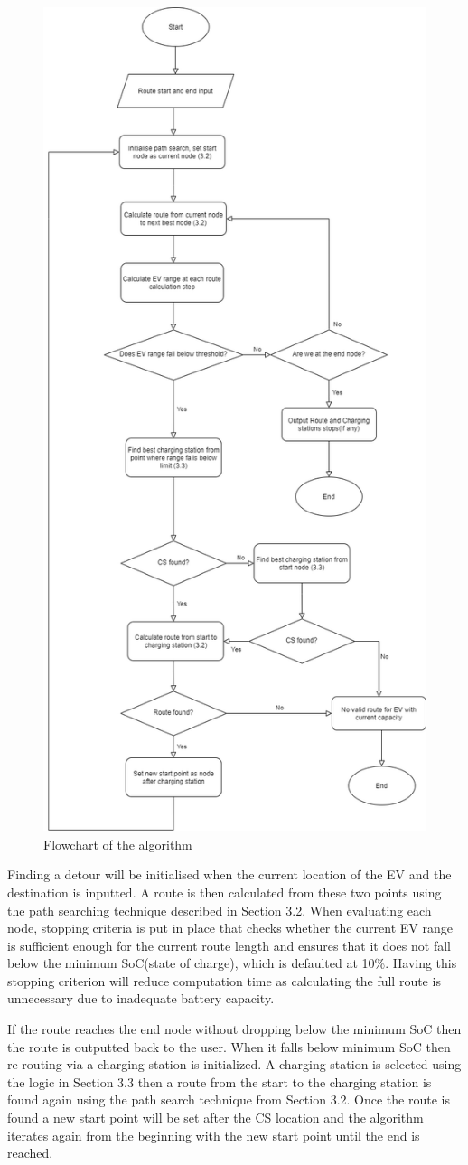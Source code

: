 \documentclass[11pt]{report}
\begin{document}
\begin{figure}[h!]
  \centering
  \includegraphics[width=0.56\linewidth]{AlgFlow.png}
  \caption{Flowchart of the algorithm}
  \label{fig:3}
\end{figure}

Finding a detour will be initialised when the current location of the EV and the destination is inputted. A route is then calculated from these two points using the path searching technique described in Section 3.2. When evaluating each node, stopping criteria is put in place that checks whether the current EV range is sufficient enough for the current route length and ensures that it does not fall below the minimum SoC(state of charge), which is defaulted at 10\%. Having this stopping criterion will reduce computation time as calculating the full route is unnecessary due to inadequate battery capacity. 

If the route reaches the end node without dropping below the minimum SoC then the route is outputted back to the user. When it falls below minimum SoC then re-routing via a charging station is initialized. A charging station is selected using the logic in Section 3.3 then a route from the start to the charging station is found again using the path search technique from Section 3.2. Once the route is found a new start point will be set after the CS location and the algorithm iterates again from the beginning with the new start point until the end is reached.
\end{document}
